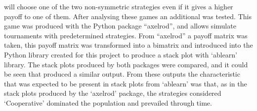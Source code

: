will choose one of the two non-symmetric strategies even if it gives a higher payoff to one of them. After analysing these games an additional was tested. This game was produced with the Python package ``axelrod'', and allows simulate tournaments with predetermined strategies. From ``axelrod'' a payoff matrix was taken, this payoff matrix was transformed into a bimatrix and introduced into the Python library created for this project to produce a stack plot with `ablearn' library. The stack plots produced by both packages were compared, and it could be seen that produced a similar output. From these outputs the characteristic that was expected to be present in stack plots from `ablearn' was that, as in the stack plots produced by the `axelrod' package, the strategies considered `Cooperative' dominated the population and prevailed through time.